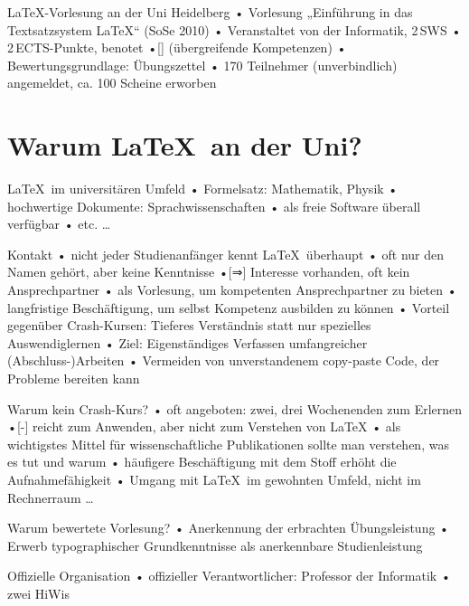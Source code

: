 \documentclass[t]{beamer}
\begin{document}
\begin{frame}{\LaTeX-Vorlesung an der Uni Heidelberg}
• Vorlesung „Einführung in das Textsatzsystem \LaTeX“ (SoSe 2010)
• Veranstaltet von der Informatik, 2\,SWS
• 2\,ECTS-Punkte, benotet
•[] (übergreifende Kompetenzen)
• Bewertungsgrundlage: Übungszettel
• 170 Teilnehmer (unverbindlich) angemeldet, ca. 100 Scheine erworben
\•
\end{frame}

\section{Warum \LaTeX\ an der Uni?}
\begin{frame}{\LaTeX\ im universitären Umfeld}
• Formelsatz: Mathematik, Physik
• hochwertige Dokumente: Sprachwissenschaften
• als freie Software überall verfügbar
• etc. … 
\•
\end{frame}

\begin{frame}{Kontakt}
• nicht jeder Studienanfänger kennt \LaTeX\ überhaupt
• oft nur den Namen gehört, aber keine Kenntnisse
•[⇒] Interesse vorhanden, oft kein Ansprechpartner
• als Vorlesung, um kompetenten Ansprechpartner zu bieten
• langfristige Beschäftigung, um selbst Kompetenz ausbilden zu können
• Vorteil gegenüber Crash-Kursen: Tieferes Verständnis statt nur spezielles Auswendiglernen
• Ziel: Eigenständiges Verfassen umfangreicher (Abschluss-)Arbeiten
• Vermeiden von unverstandenem copy-paste Code, der Probleme bereiten kann
\•
\end{frame}

\begin{frame}{Warum kein Crash-Kurs?}
• oft angeboten: zwei, drei Wochenenden zum Erlernen
•[-] reicht zum Anwenden, aber nicht zum Verstehen von \LaTeX
• als wichtigstes Mittel für wissenschaftliche Publikationen sollte man verstehen, was es tut und warum
• häufigere Beschäftigung mit dem Stoff erhöht die Aufnahmefähigkeit
• Umgang mit \LaTeX\ im gewohnten Umfeld, nicht im Rechnerraum …
\•
\end{frame}

\begin{frame}{Warum bewertete Vorlesung?}
• Anerkennung der erbrachten Übungsleistung
• Erwerb typographischer Grundkenntnisse als anerkennbare Studienleistung
\•
\end{frame}

\begin{frame}{Offizielle Organisation}
• offizieller Verantwortlicher: Professor der Informatik
• zwei HiWis
\•
\end{frame}
\end{document}
